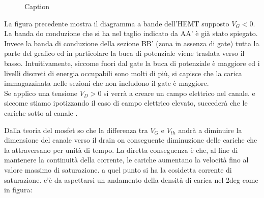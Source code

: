 \begin{figure}[hbt!]
    \caption{Caption}%
    \label{fig:enter-label}
\end{figure}
La figura precedente mostra il diagramma a bande dell'HEMT supposto $V_G<0$.
La banda do conduzione che si ha nel taglio indicato da AA' è già stato spiegato. Invece la banda di conduzione della sezione BB' (zona in assenza di gate) tutta la parte del grafico ed in particolare la buca di potenziale viene traslata verso il basso. Intuitivamente, siccome fuori dal gate la buca di potenziale è maggiore ed i livelli discreti di energia occupabili sono molti di più, si capisce che la carica immagazzinata nelle sezioni che non includono il gate è maggiore.\\

Se applico una tensione $V_D>0$ si verrà a creare un campo elettrico nel canale. e siccome stiamo ipotizzando il caso di campo elettrico elevato, succederà che le cariche sotto al canale .\

Dalla teoria del mosfet so che la differenza tra $V_G$ e $V_{th}$ andrà a diminuire la dimensione del canale verso il drain on conseguente diminuzione delle cariche che la attraversano per unità di tempo. La diretta conseguenza è che, al fine di mantenere la continuità della corrente, le cariche aumentano la velocità fino al valore massimo di saturazione. a quel punto si ha la cosidetta corrente di saturazione.
c'è da aspettarsi un andamento della densità di carica nel 2deg come in figura:


